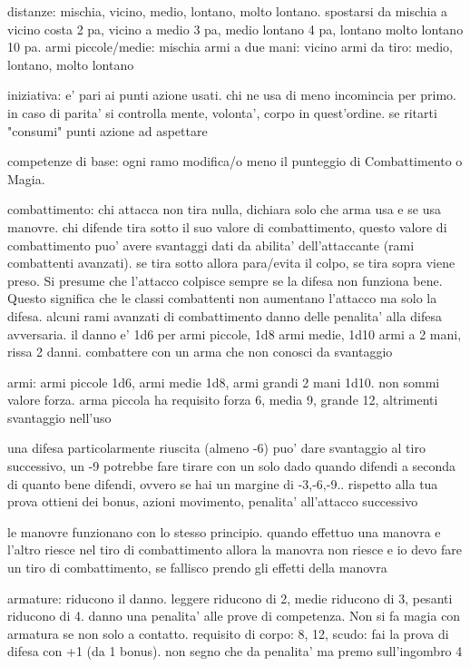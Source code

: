 \documentclass[12pt,a4paper,twoside,openany,twocolumn]{book}
\begin{document}
distanze: mischia, vicino, medio, lontano, molto lontano. spostarsi da mischia a vicino costa 2 pa, vicino a medio 3 pa, medio lontano 4 pa, lontano molto lontano 10 pa.
armi piccole/medie: mischia
armi a due mani: vicino
armi da tiro: medio, lontano, molto lontano

iniziativa: e' pari ai punti azione usati. chi ne usa di meno incomincia per primo. in caso di parita' si controlla mente, volonta', corpo in quest'ordine. se ritarti "consumi" punti azione ad aspettare

competenze di base: ogni ramo modifica/o meno il punteggio di Combattimento o Magia.

combattimento: chi attacca non tira nulla, dichiara solo che arma usa e se usa manovre. chi difende tira sotto il suo valore di combattimento, questo valore di combattimento puo' avere svantaggi dati da abilita' dell'attaccante (rami combattenti avanzati). se tira sotto allora para/evita il colpo, se tira sopra viene preso.
Si presume che l'attacco colpisce sempre se la difesa non funziona bene. Questo significa che le classi combattenti non aumentano l'attacco ma solo la difesa. alcuni rami avanzati di combattimento danno delle penalita' alla difesa avversaria.
il danno e' 1d6 per armi piccole, 1d8 armi medie, 1d10 armi a 2 mani, rissa 2 danni.
combattere con un arma che non conosci da svantaggio


armi: armi piccole 1d6, armi medie 1d8, armi grandi 2 mani 1d10. non sommi valore forza. arma piccola ha requisito forza 6, media 9, grande 12, altrimenti svantaggio nell'uso

una difesa particolarmente riuscita (almeno -6) puo' dare svantaggio al tiro successivo, un -9 potrebbe fare tirare con un solo dado
quando difendi  a seconda di quanto bene difendi, ovvero se hai un margine di -3,-6,-9.. rispetto alla tua prova ottieni dei bonus, azioni movimento, penalita' all'attacco successivo

le manovre funzionano con lo stesso principio. quando effettuo una manovra e l'altro riesce nel tiro di combattimento allora la manovra non riesce e io devo fare un tiro di combattimento, se fallisco prendo gli effetti della manovra

armature: riducono il danno. leggere riducono di 2, medie riducono di 3, pesanti riducono di 4. danno una penalita' alle prove di competenza. Non si fa magia con armatura se non solo a contatto. requisito di corpo: 8, 12, 
scudo: fai la prova di difesa con +1 (da 1 bonus). non segno che da penalita' ma premo sull'ingombro 4
\end{document}
